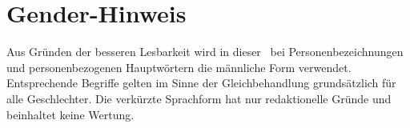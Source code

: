 \cleardoublepage

\chapter*{Gender-Hinweis}
\thispagestyle{plain}

Aus Gründen der besseren Lesbarkeit wird in dieser \myworktype ~bei Personenbezeichnungen und personenbezogenen Hauptwörtern die männliche Form verwendet. Entsprechende Begriffe gelten im Sinne der Gleichbehandlung grundsätzlich für alle Geschlechter. Die verkürzte Sprachform hat nur redaktionelle Gründe und beinhaltet keine Wertung.

\newpage